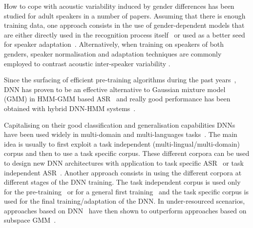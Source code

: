 \documentclass{nle}
\begin{document}

How to  cope with acoustic  variability induced by  gender differences
has been studied  for adult speakers in a  number of papers.  Assuming
that there is enough training  data, one  approach  consists in  the use  of
gender-dependent  models   that  are  either  directly   used  in  the
recognition process itself~\citep*{YocMor92,WooOdeValYou94} or used as a
better  seed for  speaker  adaptation~\citep*{LeeGau93}.  Alternatively,
when training  on speakers of both genders,  speaker normalisation and
adaptation  techniques  are  commonly  employed to  contrast  acoustic
inter-speaker variability \citep*{LeeRos96,Gal98}.

Since the  surfacing of  efficient pre-training algorithms  during the
past years~\citep*{hinton06,bengio07,erhan10,seide11}, DNN has proven to
be an  effective alternative to  Gaussian  mixture model
(GMM) in  HMM-GMM based ASR~\citep*{bourlard94,hinton12} and  really good
performance    has     been    obtained    with     hybrid    DNN-HMM
systems~\citep*{dahl12,mohamed12}.

Capitalising  on their good  classification and generalisation capabilities
 DNNs have  been used  widely in  multi-domain  and multi-languages
tasks~\citep*{sivadas04,stolcke06}.  The  main idea is  usually to first
exploit  a task  independent  (multi-lingual/multi-domain) corpus  and
then to  use a task specific  corpus.  These different  corpora can be
used to design new DNN architectures with application to task specific
ASR~\citep*{pinto09}  or  task  independent ASR~\citep*{bell13}.   Another
approach consists in using the different corpora at different stages of
the DNN  training. The  task independent corpus  is used only  for the
pre-training~\citep*{swietojanski12}      or       for      a  general    first
training~\citep*{vietbac10,thomas13} and the task specific corpus is used
for  the  final  training/adaptation  of the  DNN.   In  under-resourced
scenarios, approaches based on  DNN~\citep*{imseng13} have then shown to
outperform approaches based on  subspace GMM~\citep*{burget13}.
\end{document}
